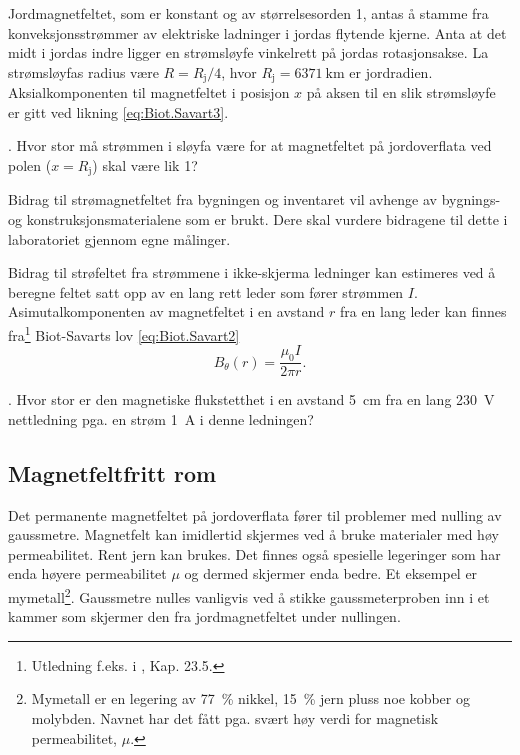 \documentclass[../Elmag-labhefte-2020.tex]{subfiles}
\begin{document}
Jordmagnetfeltet, som er konstant og av størrelsesorden \SI{1}{\gauss}, antas å stamme fra konveksjonsstrømmer av elektriske ladninger i jordas flytende kjerne. Anta at det midt i jordas indre ligger en strømsløyfe vinkelrett på jordas rotasjonsakse. La strømsløyfas radius være $R = R_\text{j}/4$, hvor $R_\text{j} = \SI{6371}{\km}$ er jordradien. Aksialkomponenten til magnetfeltet i posisjon $x$ på aksen til en slik strømsløyfe er gitt ved likning \eqref{eq:Biot.Savart3}.

{. Hvor stor må strømmen i sløyfa være for at magnetfeltet på jordoverflata ved polen ($x = R_\text{j}$) skal være lik \SI{1}{\gauss}? }


Bidrag til strømagnetfeltet fra bygningen og inventaret vil avhenge av bygnings- og konstruksjonsmaterialene som er brukt. Dere skal vurdere bidragene til dette i laboratoriet gjennom egne målinger.

Bidrag til strøfeltet fra strømmene i ikke-skjerma ledninger kan estimeres ved å beregne feltet satt opp av en lang rett leder som fører strømmen $I$. Asimutalkomponenten av magnetfeltet i en avstand $r$ fra en lang leder kan finnes fra\footnote{Utledning f.eks. i \cite{lillestol}, Kap. 23.5.} Biot-Savarts lov \eqref{eq:Biot.Savart2}
\begin{equation}
    B_\theta (r) = \frac{\mu_0 I}{2\pi r} .
\end{equation}

{. Hvor stor er den magnetiske flukstetthet i en avstand \SI{5}{\cm} fra en lang \SI{230}{\volt} nettledning pga. en strøm \SI{1}{\ampere} i denne ledningen?}

\subsection{Magnetfeltfritt rom \label{ch.mymetall}}

Det permanente magnetfeltet på jordoverflata fører til problemer med nulling av gaussmetre. Magnetfelt kan imidlertid skjermes ved å bruke materialer med høy permeabilitet. Rent jern kan brukes. Det finnes også spesielle legeringer som har enda høyere permeabilitet $\mu$ og dermed skjermer enda bedre. Et eksempel er mymetall\footnote{Mymetall er en legering av \SI{77}{\percent} nikkel, \SI{15}{\percent} jern pluss noe kobber og molybden.  Navnet har det fått pga. svært høy verdi for magnetisk permeabilitet, $\mu$.}. Gaussmetre nulles vanligvis ved å stikke gaussmeterproben inn i et kammer som skjermer den fra jordmagnetfeltet under nullingen. 
\end{document}
